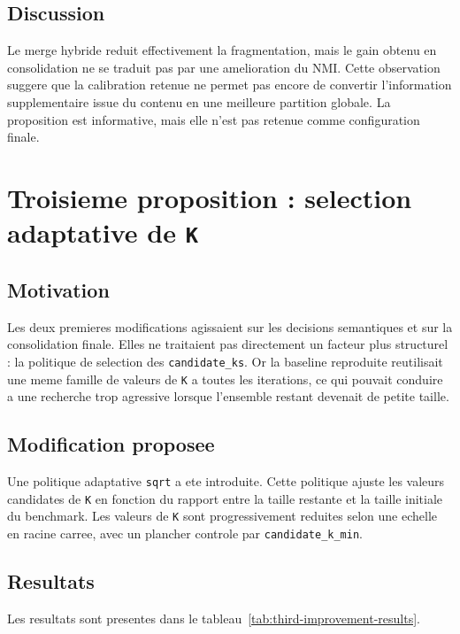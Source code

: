 \subsection{Discussion}

Le merge hybride reduit effectivement la fragmentation, mais le gain obtenu en
consolidation ne se traduit pas par une amelioration du NMI. Cette observation
suggere que la calibration retenue ne permet pas encore de convertir
l'information supplementaire issue du contenu en une meilleure partition
globale. La proposition est informative, mais elle n'est pas retenue comme
configuration finale.

\section{Troisieme proposition : selection adaptative de \texttt{K}}

\subsection{Motivation}

Les deux premieres modifications agissaient sur les decisions semantiques et
sur la consolidation finale. Elles ne traitaient pas directement un facteur
plus structurel : la politique de selection des \texttt{candidate\_ks}. Or la
baseline reproduite reutilisait une meme famille de valeurs de \texttt{K} a
toutes les iterations, ce qui pouvait conduire a une recherche trop agressive
lorsque l'ensemble restant devenait de petite taille.

\subsection{Modification proposee}

Une politique adaptative \texttt{sqrt} a ete introduite. Cette politique ajuste
les valeurs candidates de \texttt{K} en fonction du rapport entre la taille
restante et la taille initiale du benchmark. Les valeurs de \texttt{K} sont
progressivement reduites selon une echelle en racine carree, avec un plancher
controle par \texttt{candidate\_k\_min}.

\subsection{Resultats}

Les resultats sont presentes dans le
tableau~\ref{tab:third-improvement-results}.

